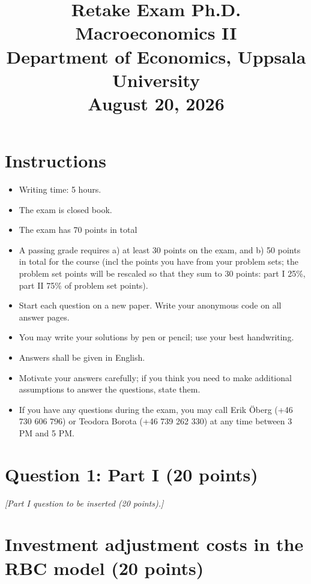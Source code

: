 \documentclass[11pt]{article}
\title{Retake Exam Ph.D. Macroeconomics II \\
Department of Economics, Uppsala University\\
August 20, 2026}
\author{}
\date{}
\newcommand{\bit}{\begin{itemize}}
\newcommand{\eit}{\end{itemize}}
\begin{document}
\maketitle

\section*{Instructions}
\bit
	\item Writing time: 5 hours.
	
	\item The exam is closed book. 
	
	\item The exam has 70 points in total 
	
	\item A passing grade requires a) at least 30 points on  the exam, and b) 50 points in total for the course (incl the points you have from your problem sets; the problem set points will be rescaled so that they sum to 30 points: part I 25\%, part II 75\% of problem set points).
	
	\item Start each question on a new paper. Write your anonymous code on all answer pages.
	
	\item You may write your solutions by pen or pencil; use your best handwriting.
	
	\item Answers shall be given in English.

	\item Motivate your answers carefully; if you think you need to make additional assumptions to answer the questions, state them.
	
	\item If you have any questions during the exam, you may call Erik \"{O}berg (+46 730 606 796) or Teodora Borota (+46 739 262 330) at any time between 3 PM and 5 PM.
\eit

\newpage

\section{Question 1: Part I (20 points)}

\textit{[Part I question to be inserted (20 points).]}

\newpage

\section{Investment adjustment costs in the RBC model (20 points)}
\end{document}
